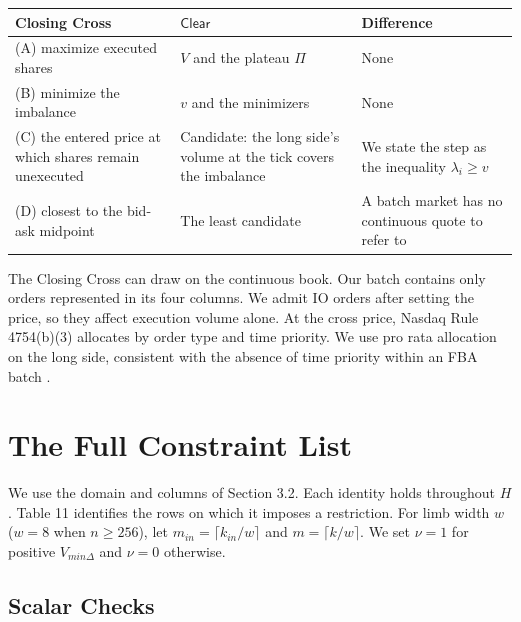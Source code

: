 \begin{longtable}{@{}
  >{\raggedright\arraybackslash}p{}
  >{\raggedright\arraybackslash}p{}
  >{\raggedright\arraybackslash}p{}
@{}}
\toprule
Closing Cross & \(\mathsf{Clear}\) & Difference \\
\midrule
\endhead
\bottomrule
\endlastfoot

(A) maximize executed shares
  & \(V\) and the plateau \(\Pi\)
  & None \\

(B) minimize the imbalance
  & \(v\) and the minimizers
  & None \\

(C) the entered price at which shares remain unexecuted
  & Candidate: the long side's volume at the tick covers the imbalance
  & We state the step as the inequality \(\lambda_i \ge v\) \\

(D) closest to the bid-ask midpoint
  & The least candidate
  & A batch market has no continuous quote to refer to \\
\end{longtable}

The Closing Cross can draw on the continuous book. Our batch contains only orders represented in its four columns. We admit IO orders after setting the price, so they affect execution volume alone. At the cross price, Nasdaq Rule 4754(b)(3) allocates by order type and time priority. We use pro rata allocation on the long side, consistent with the absence of time priority within an FBA batch \cite{budish2015}.


\section{The Full Constraint List}

We use the domain and columns of Section 3.2. Each identity holds throughout \(H\). Table 11 identifies the rows on which it imposes a restriction. For limb width \(w\) (\(w=8\) when \(n\ge256\)), let \(m_{in}=\lceil k_{in}/w\rceil\) and \(m=\lceil k/w\rceil\). We set \(\nu=1\) for positive \(V_{min\Delta}\) and \(\nu=0\) otherwise.

\subsection{Scalar Checks}


